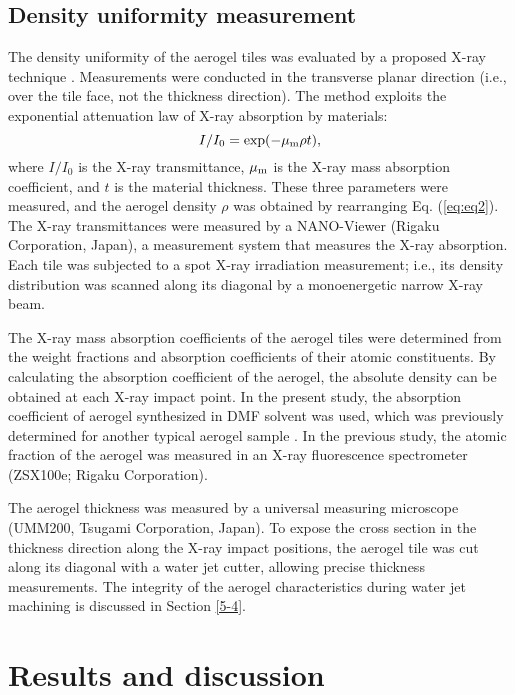 \documentclass[5p,twocolumn]{elsarticle}
\begin{document}
\subsection{Density uniformity measurement}
\label{4-3}

The density uniformity of the aerogel tiles was evaluated by a proposed X-ray technique \cite{cite20}. Measurements were conducted in the transverse planar direction (i.e., over the tile face, not the thickness direction). The method exploits the exponential attenuation law of X-ray absorption by materials:
\begin{equation}
\label{eq:eq2}
I/I_0=\exp(-\mu_{\rm m}\rho t),
\end{equation}
where $I/I_0$ is the X-ray transmittance, $\mu_{\rm m}$ is the X-ray mass absorption coefficient, and $t$ is the material thickness. These three parameters were measured, and the aerogel density $\rho $ was obtained by rearranging Eq. (\ref{eq:eq2}). The X-ray transmittances were measured by a NANO-Viewer (Rigaku Corporation, Japan), a measurement system that measures the X-ray absorption. Each tile was subjected to a spot X-ray irradiation measurement; i.e., its density distribution was scanned along its diagonal by a monoenergetic narrow X-ray beam.

The X-ray mass absorption coefficients of the aerogel tiles were determined from the weight fractions and absorption coefficients of their atomic constituents. By calculating the absorption coefficient of the aerogel, the absolute density can be obtained at each X-ray impact point. In the present study, the absorption coefficient of aerogel synthesized in DMF solvent was used, which was previously determined for another typical aerogel sample \cite{cite20}. In the previous study, the atomic fraction of the aerogel was measured in an X-ray fluorescence spectrometer (ZSX100e; Rigaku Corporation).

The aerogel thickness was measured by a universal measuring microscope (UMM200, Tsugami Corporation, Japan). To expose the cross section in the thickness direction along the X-ray impact positions, the aerogel tile was cut along its diagonal with a water jet cutter, allowing precise thickness measurements. The integrity of the aerogel characteristics during water jet machining is discussed in Section \ref{5-4}.

\section{Results and discussion}
\label{5}
\end{document}
